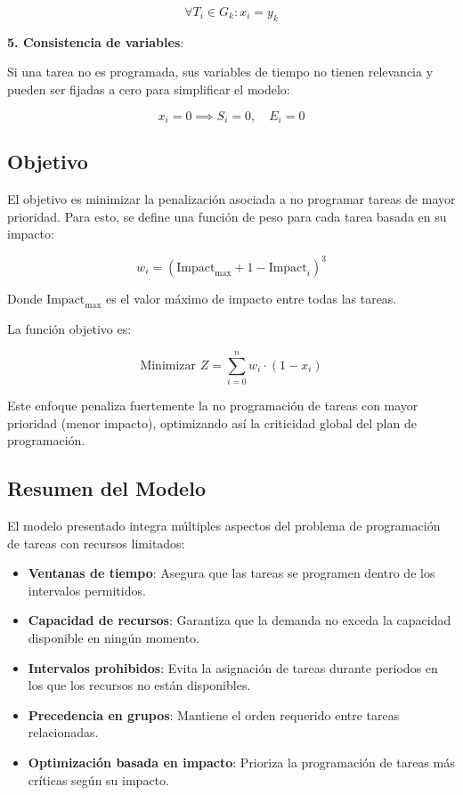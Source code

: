 \documentclass{article}
\begin{document}
\[
\forall T_i \in G_k: x_i = y_k
\]

\textbf{5. Consistencia de variables}:

Si una tarea no es programada, sus variables de tiempo no tienen relevancia y pueden ser fijadas a cero para simplificar el modelo:

\[
x_i = 0 \implies S_i = 0, \quad E_i = 0
\]

\vspace{0.5cm}

\subsection*{Objetivo}

El objetivo es minimizar la penalización asociada a no programar tareas de mayor prioridad. Para esto, se define una función de peso para cada tarea basada en su impacto:

\[
w_i = (\text{Impact}_{\text{max}} + 1 - \text{Impact}_i)^3
\]

Donde \( \text{Impact}_{\text{max}} \) es el valor máximo de impacto entre todas las tareas.

La función objetivo es:

\[
\text{Minimizar } Z = \sum_{i=0}^{n} w_i \cdot (1 - x_i)
\]

Este enfoque penaliza fuertemente la no programación de tareas con mayor prioridad (menor impacto), optimizando así la criticidad global del plan de programación.

\vspace{0.5cm}

\subsection*{Resumen del Modelo}

El modelo presentado integra múltiples aspectos del problema de programación de tareas con recursos limitados:

\begin{itemize}
    \item \textbf{Ventanas de tiempo}: Asegura que las tareas se programen dentro de los intervalos permitidos.
    \item \textbf{Capacidad de recursos}: Garantiza que la demanda no exceda la capacidad disponible en ningún momento.
    \item \textbf{Intervalos prohibidos}: Evita la asignación de tareas durante periodos en los que los recursos no están disponibles.
    \item \textbf{Precedencia en grupos}: Mantiene el orden requerido entre tareas relacionadas.
    \item \textbf{Optimización basada en impacto}: Prioriza la programación de tareas más críticas según su impacto.
\end{itemize}
\end{document}
